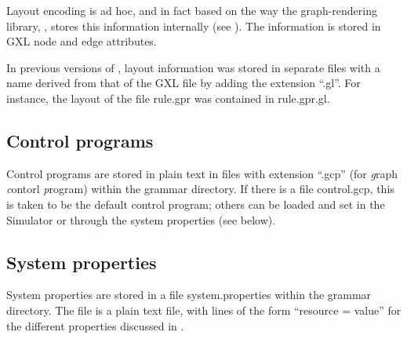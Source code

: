 Layout encoding is ad hoc, and in fact based on the way the
graph-rendering library, \JGraph, stores this information internally (see
\cite{JGraph}). The information is stored in GXL node and edge attributes.

In previous versions of \GROOVE, layout information was stored in separate
files with a name derived from that of the GXL file by adding the extension
``\textsf{.gl}''. For instance, the layout of the file \textsf{rule.gpr} was
contained in \textsf{rule.gpr.gl}.

\subsection{Control programs}

Control programs are stored in plain text in files with extension
``\textsf{.gcp}'' (for \emph{g}raph \emph{c}ontorl \emph{p}rogram) within the
grammar directory. If there is a file \textsf{control.gcp}, this is taken to be
the default control program; others can be loaded and set in the Simulator or
through the system properties (see below).

\subsection{System properties}

System properties are stored in a file \textsf{system.properties} within the
grammar directory. The file is a plain text file, with lines of the form
``\textsf{resource = value}'' for the different properties discussed in
.
